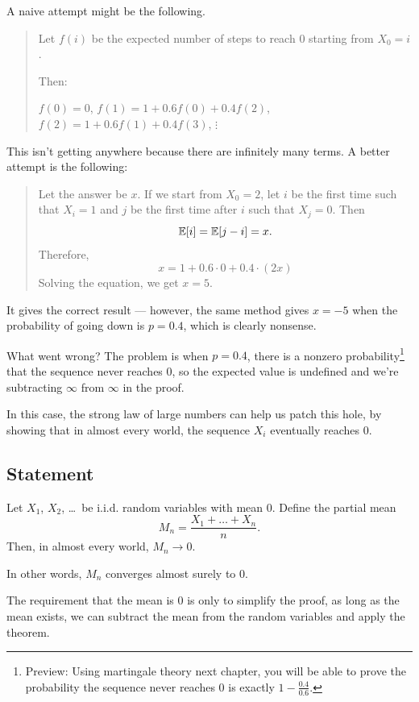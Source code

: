 A naive attempt might be the following.
\begin{quote}
	Let $f(i)$ be the expected number of steps to reach $0$ starting from $X_0=i$.

	Then:
	\begin{itemize}
		\ii $f(0)=0$,
		\ii $f(1)=1+0.6 f(0)+0.4 f(2)$,
		\ii $f(2)=1+0.6 f(1)+0.4 f(3)$,
		\ii $\vdots$
	\end{itemize}
\end{quote}
This isn't getting anywhere because there are infinitely many terms.
A better attempt is the following:
\begin{quote}
	Let the answer be $x$.
	If we start from $X_0=2$, let $i$ be the first time such that $X_i=1$
	and $j$ be the first time after $i$ such that $X_j=0$. Then
	\[ \mathbb E[i]=\mathbb E[j-i]=x. \]
	Therefore,
	\[ x = 1 + 0.6 \cdot 0 + 0.4 \cdot (2x) \]
	Solving the equation, we get $x=5$.
\end{quote}
It gives the correct result --- however, the same method gives $x=-5$ when
the probability of going down is $p=0.4$, which is clearly nonsense.

What went wrong? The problem is when $p=0.4$, there is a nonzero probability\footnote{%
	Preview: Using martingale theory next chapter, you will be able to prove the probability
	the sequence never reaches $0$ is exactly $1-\frac{0.4}{0.6}$.
} that the
sequence never reaches $0$, so the expected value is undefined
and we're subtracting $\infty$ from $\infty$ in the proof.

In this case, the strong law of large numbers can help us patch this hole, by showing that in almost
every world, the sequence $X_i$ eventually reaches $0$.

\subsection{Statement}

\begin{theorem}
Let $X_1$, $X_2$, \dots\ be i.i.d. random variables with mean $0$.
Define the partial mean
\[ M_n = \frac{X_1+\dots+X_n}{n}. \]
Then, in almost every world, $M_n \to 0$.
\end{theorem}
In other words, $M_n$ converges almost surely to $0$.

The requirement that the mean is $0$ is only to simplify the proof,
as long as the mean exists, we can subtract the mean from the random variables and apply the
theorem.

